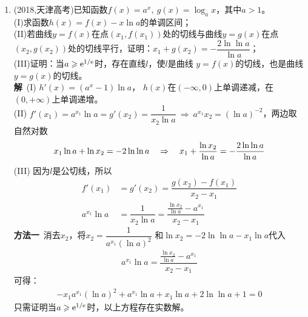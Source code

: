 \begin{enumerate}[label={【\textbf{例\thechapter.\arabic*}】},
 leftmargin=\inteval{\myenumleftmargin}pt,
 itemsep=\inteval{\myenumitempsep}pt,
 itemindent=\inteval{\myenumitemindent}pt]
\begin{gather*}
{        \right|}{f'(x_1)}>\frac{\left|f\Big(\dfrac{p}{q}\Big)\right|}{f'(2)}
    =\frac{\left|2p^4+3p^3q-3p^2q^2-6pq^3+aq^4\right|}{f'(2)q^4}
\end{gather*}
因为$ \dfrac{p}{q}-x_0\neq 0 $，所以$ |2p^4+3p^3q-3p^2q^2-
6pq^3+aq^4|>0 $，又因为$ p,q $为正整数，所以
$ |2p^4+3p^3q-3p^2q^2-6pq^3+aq^4| $也是正整数，
那么它必然大于等于1，
\begin{gather*}
    \left|\frac{p}{q}-x_0\right|>\frac{1}{f'(2)q^4}
\end{gather*}
只需令$ A=|f'(2)| $，就有$ \left|\dfrac{p}{q}-x_0\right|>\dfrac{1}{Aq^4} $.\\
\textbf{注}：第(2)问实际上是拉格朗日中值定理，设$ m\in[1,x_0) $，做逆向分析，
有$ h(m)=\varphi_1(m)>0 $，$ h(x_0)=\varphi_2(m)<0 $，$ f'(x_0)(m-x_0)<f(m)
<f'(m)(m-x_0) $，即
\begin{gather}
    f'(x_0)<\frac{f(m)-f(x_0)}{m-x_0}=f'(\xi)<f'(m)
\end{gather}
因为$ f'(x) $在$ (\dfrac{1}{4},+\infty) $上单调递增，所以上式显然成立。

第(3)问实际上是刘维尔逼近定理。

\item (2018,天津高考)已知函数$ f(x)=a^x,\ g(x)=\log_{a} x $，其中$ a>1 $。\\
(I)求函数$ h(x)=f(x)-x\ln a $的单调区间；\\
(II)若曲线$ y=f(x) $在点$ (x_1,f(x_1)) $处的切线与曲线$ y=g(x) $在点
$ (x_2,g(x_2)) $处的切线平行，证明：$ x_1+g(x_2)=
-\dfrac{2\ln\ln a}{\ln a} $；\\
(III)证明：当$ a\geqslant \mathrm{e}^{1/\mathrm{e}} $时，存在直线$ l $，使$ l $是曲线
$ y=f(x) $的切线，也是曲线$ y=g(x) $的切线。\\
\textbf{解}\ (I) $ h'(x)=(a^x-1)\ln a $，
$ h(x) $在$ (-\infty,0) $上单调递减，在$ (0,+\infty) $上单调递增。\\
(II) $ f'(x_1)=a^{x_1}\ln a=g'(x_2)=\dfrac{1}{x_2\ln a}\
\Rightarrow \  a^{x_1}x_2=(\ln a)^{-2} $，两边取自然对数
\begin{gather*}
    x_1\ln a+\ln x_2=-2\ln\ln a\quad \Rightarrow \quad 
    x_1+\frac{\ln x_2}{\ln a}=-\dfrac{2\ln\ln a}{\ln a}
\end{gather*}
(III) 因为$ l $是公切线，所以
\begin{align*}
    f'(x_1) &=g'(x_2)=\dfrac{g(x_2)-f(x_1)}{x_2-x_1} \\
    a^{x_1}\ln a &=\dfrac{1}{x_2\ln a}=\dfrac{\frac{\ln x_2}{\ln a}
        -a^{x_1}}{x_2-x_1}
\end{align*}
\textbf{方法一}\ 消去$ x_2 $，将$ x_2=\dfrac{1}{a^{x_1}(\ln a)^2} $
和$ \ln x_2=-2\ln\ln a-x_1\ln a $代入
\begin{gather*}
    a^{x_1}\ln a =\dfrac{\frac{\ln x_2}{\ln a}-a^{x_1}}{x_2-x_1}
\end{gather*}
可得：
\begin{gather*}
    -x_1a^{x_1}(\ln a)^2+a^{x_1}\ln a +x_1\ln a+2\ln\ln a+1=0
\end{gather*}
只需证明当$ a\geqslant \mathrm{e}^{1/\mathrm{e}} $时，以上方程存在实数解。


\end{enumerate}
